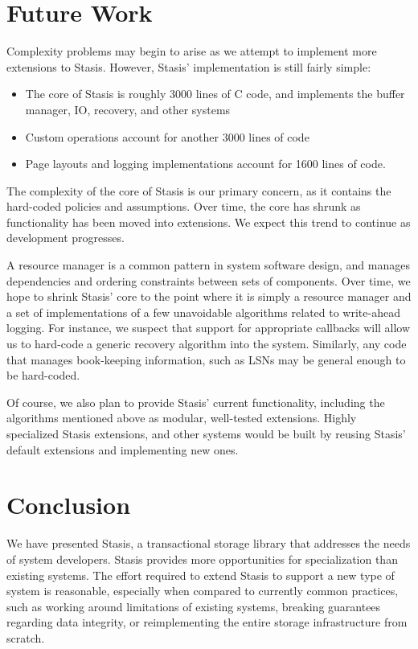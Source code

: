 \documentclass[letterpaper,twocolumn,10pt]{article}
\newcommand{\yad}{Stasis\xspace}
\newcommand{\yads}{Stasis'\xspace}
\begin{document}
\section{Future Work}

Complexity problems may begin to arise as we attempt to implement more
extensions to \yad.  However, \yads implementation is still fairly simple:

\begin{itemize}
\item The core of \yad is roughly 3000 lines
of C code, and implements the buffer manager, IO, recovery, and other
systems
\item Custom operations account for another 3000 lines of code
\item Page layouts and logging implementations account for 1600 lines of code.
\end{itemize}

The complexity of the core of \yad is our primary concern, as it
contains the hard-coded policies and assumptions.  Over time, the core has
shrunk as functionality has been moved into extensions.  We expect
this trend to continue as development progresses.  

A resource manager
is a common pattern in system software design, and manages
dependencies and ordering constraints between sets of components.
Over time, we hope to shrink \yads core to the point where it is
simply a resource manager and a set of implementations of a few unavoidable
algorithms related to write-ahead logging.  For instance, 
we suspect that support for appropriate callbacks will 
allow us to hard-code a generic recovery algorithm into the 
system.  Similarly, any code that manages book-keeping information, such as 
LSNs may be general enough to be hard-coded.  

Of course, we also plan to provide \yads current functionality, including the algorithms
mentioned above as modular, well-tested extensions.
Highly specialized \yad extensions, and other systems would be built
by reusing \yads default extensions and implementing new ones.


\section{Conclusion}

We have presented \yad, a transactional storage library that addresses
the needs of system developers.  \yad provides more opportunities for
specialization than existing systems.  The effort required to extend
\yad to support a new type of system is reasonable, especially when
compared to currently common practices, such as working around
limitations of existing systems, breaking guarantees regarding data
integrity, or reimplementing the entire storage infrastructure from
scratch.
\end{document}
